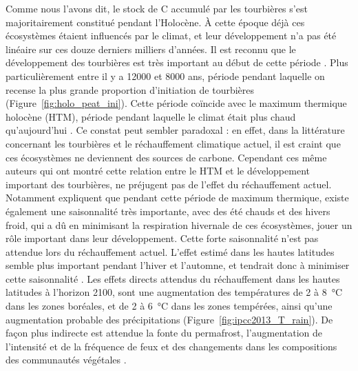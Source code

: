 Comme nous l'avons dit, le stock de C accumulé par les tourbières s'est majoritairement constitué pendant l'Holocène.
À cette époque déjà ces écosystèmes étaient influencés par le climat, et leur développement n'a pas été linéaire sur ces douze derniers milliers d'années.
Il est reconnu que le développement des tourbières est très important au début de cette période \citep{smith2004,macdonald2006,yu2009}.
Plus particulièrement entre il y a \num{12000} et \num{8000} ans, période pendant laquelle on recense la plus grande proportion d'initiation de tourbières (Figure~\ref{fig:holo_peat_ini}).
Cette période coïncide avec le maximum thermique holocène (HTM), période pendant laquelle le climat était plus chaud qu'aujourd’hui \citep{kaufman2004}.
Ce constat peut sembler paradoxal : en effet, dans la littérature concernant les tourbières et le réchauffement climatique actuel, il est craint que ces écosystèmes ne deviennent des sources de carbone.
Cependant ces même auteurs qui ont montré cette relation entre le HTM et le développement important des tourbières, ne préjugent pas de l'effet du réchauffement actuel.
Notamment \citet{jones2010} expliquent que pendant cette période de maximum thermique, existe également une saisonnalité très importante, avec des été chauds et des hivers froid, qui a dû en minimisant la respiration hivernale de ces écosystèmes, jouer un rôle important dans leur développement.
Cette forte saisonnalité n'est pas attendue lors du réchauffement actuel.
L'effet estimé dans les hautes latitudes semble plus important pendant l'hiver et l'automne, et tendrait donc à minimiser cette saisonnalité \citep{christensen2007}.
Les effets directs attendus du réchauffement dans les hautes latitudes à l'horizon 2100, sont une augmentation des températures de 2 à \SI{8}{\degreeCelsius} dans les zones boréales, et de 2 à \SI{6}{\degreeCelsius} dans les zones tempérées, ainsi  qu'une augmentation probable des précipitations (Figure~\ref{fig:ipcc2013_T_rain}).
De façon plus indirecte est attendue la fonte du permafrost, l'augmentation de l'intensité et de la fréquence de feux et des changements dans les compositions des communautés végétales \citep{christensen2013,frolking2011}.

